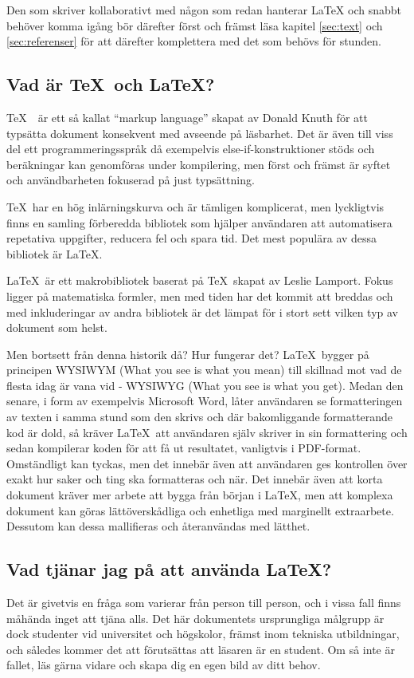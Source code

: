 Den som skriver kollaborativt med någon som redan hanterar \LaTeX{} och snabbt behöver komma igång bör därefter först och främst läsa kapitel \ref{sec:text} och \ref{sec:referenser} för att därefter komplettera med det som behövs för stunden.

\subsection{Vad är \TeX\ och \LaTeX?}
\TeX\ \lbrack{}\rbrack\ är ett så kallat ``markup language'' skapat av Donald Knuth för att typsätta dokument konsekvent med avseende på läsbarhet. Det är även till viss del ett programmeringsspråk då exempelvis else-if-konstruktioner stöds och beräkningar kan genomföras under kompilering, men först och främst är syftet och användbarheten fokuserad på just typsättning.

\TeX\ har en hög inlärningskurva och är tämligen komplicerat, men lyckligtvis finns en samling förberedda bibliotek som hjälper användaren att automatisera repetativa uppgifter, reducera fel och spara tid. Det mest populära av dessa bibliotek är \LaTeX.

\LaTeX\ \lbrack{}\rbrack är ett makrobibliotek baserat på \TeX\ skapat av Leslie Lamport. Fokus ligger på matematiska formler, men med tiden har det kommit att breddas och med inkluderingar av andra bibliotek är det lämpat för i stort sett vilken typ av dokument som helst.

Men bortsett från denna historik då? Hur fungerar det? \LaTeX\ bygger på principen WYSIWYM (What you see is what you mean) till skillnad mot vad de flesta idag är vana vid - WYSIWYG (What you see is what you get). Medan den senare, i form av exempelvis Microsoft Word, låter användaren se formatteringen av texten i samma stund som den skrivs och där bakomliggande formatterande kod är dold, så kräver \LaTeX\ att användaren själv skriver in sin formattering och sedan kompilerar koden för att få ut resultatet, vanligtvis i PDF-format. Omständligt kan tyckas, men det innebär även att användaren ges kontrollen över exakt hur saker och ting ska formatteras och när. Det innebär även att korta dokument kräver mer arbete att bygga från början i \LaTeX, men att komplexa dokument kan göras lättöverskådliga och enhetliga med marginellt extraarbete. Dessutom kan dessa mallifieras och återanvändas med lätthet.

\subsection{Vad tjänar jag på att använda \LaTeX?}
Det är givetvis en fråga som varierar från person till person, och i vissa fall finns måhända inget att tjäna alls. Det här dokumentets ursprungliga målgrupp är dock studenter vid universitet och högskolor, främst inom tekniska utbildningar, och således kommer det att förutsättas att läsaren är en student. Om så inte är fallet, läs gärna vidare och skapa dig en egen bild av ditt behov.

